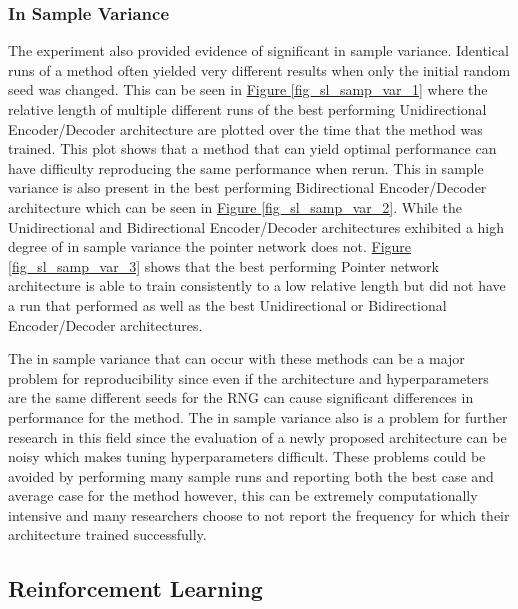 \documentclass[12pt]{article}
\begin{document}
\subsubsection{In Sample Variance}

The experiment also provided evidence of significant in sample variance. Identical runs of a method often yielded very different results when only the initial random seed was changed. This can be seen in  \hyperref[fig_sl_samp_var_1]{Figure \ref{fig_sl_samp_var_1}} where the relative length of multiple different runs of the best performing Unidirectional Encoder/Decoder architecture are plotted over the time that the method was trained. This plot shows that a method that can yield optimal performance can have difficulty reproducing the same performance when rerun. This in sample variance is also present in the best performing Bidirectional Encoder/Decoder architecture which can be seen in \hyperref[fig_sl_samp_var_2]{Figure \ref{fig_sl_samp_var_2}}. While the Unidirectional and Bidirectional Encoder/Decoder architectures exhibited a high degree of in sample variance the pointer network does not. \hyperref[fig_sl_samp_var_3]{Figure \ref{fig_sl_samp_var_3}} shows that the best performing Pointer network architecture is able to train consistently to a low relative length but did not have a run that performed as well as the best Unidirectional or Bidirectional Encoder/Decoder architectures.

The in sample variance that can occur with these methods can be a major problem for reproducibility since even if the architecture and hyperparameters are the same different seeds for the RNG can cause significant differences in performance for the method. The in sample variance also is a problem for further research in this field since the evaluation of a newly proposed architecture can be noisy which makes tuning hyperparameters difficult. These problems could be avoided by performing many sample runs and reporting both the best case and average case for the method however, this can be extremely computationally intensive and many researchers choose to not report the frequency for which their architecture trained successfully.


\subsection{Reinforcement Learning}
\end{document}
